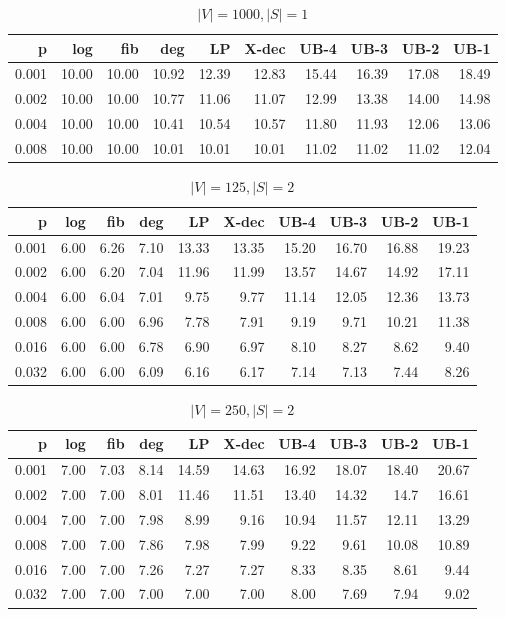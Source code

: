 \begin{table}[]
\centering
\begin{tabular}{rrrrrrrrrr}
p     & log  & fib  & deg  & LP    & X-dec & UB-4  & UB-3  & UB-2  & UB-1  \\
\hline
0.001 & 10.00 & 10.00 & 10.92 & 12.39 & 12.83 & 15.44 & 16.39 & 17.08 & 18.49 \\
0.002 & 10.00 & 10.00 & 10.77 & 11.06 & 11.07 & 12.99 & 13.38 & 14.00 & 14.98 \\
0.004 & 10.00 & 10.00 & 10.41 & 10.54 & 10.57 & 11.80 & 11.93 & 12.06 & 13.06 \\
0.008 & 10.00 & 10.00 & 10.01 & 10.01 & 10.01 & 11.02 & 11.02 & 11.02 & 12.04
\end{tabular}
\caption{$|V|=1000, |S|=1$}
\label{tab:lbup1000}
\end{table}

\begin{table}[]
\centering
\begin{tabular}{rrrrrrrrrr}
p     & log  & fib  & deg  & LP    & X-dec & UB-4  & UB-3  & UB-2  & UB-1  \\
\hline
0.001 & 6.00 & 6.26 & 7.10 & 13.33 & 13.35 & 15.20 & 16.70 & 16.88 & 19.23 \\
0.002 & 6.00 & 6.20 & 7.04 & 11.96 & 11.99 & 13.57 & 14.67 & 14.92 & 17.11 \\
0.004 & 6.00 & 6.04 & 7.01 & 9.75  & 9.77  & 11.14 & 12.05 & 12.36 & 13.73 \\
0.008 & 6.00 & 6.00 & 6.96 & 7.78  & 7.91  & 9.19  & 9.71  & 10.21 & 11.38 \\
0.016 & 6.00 & 6.00 & 6.78 & 6.90  & 6.97  & 8.10  & 8.27  & 8.62  & 9.40  \\
0.032 & 6.00 & 6.00 & 6.09 & 6.16  & 6.17  & 7.14  & 7.13  & 7.44  & 8.26 
\end{tabular}
\caption{$|V|=125, |S|=2$}
\label{tab:lbup1000}
\end{table}

\begin{table}[]
\centering
\begin{tabular}{rrrrrrrrrr}
p     & log  & fib  & deg  & LP    & X-dec & UB-4  & UB-3  & UB-2  & UB-1  \\
\hline
0.001 & 7.00 & 7.03 & 8.14 & 14.59 & 14.63 & 16.92 & 18.07 & 18.40 & 20.67 \\
0.002 & 7.00 & 7.00 & 8.01 & 11.46 & 11.51 & 13.40 & 14.32 & 14.7  & 16.61 \\
0.004 & 7.00 & 7.00 & 7.98 & 8.99  & 9.16  & 10.94 & 11.57 & 12.11 & 13.29 \\
0.008 & 7.00 & 7.00 & 7.86 & 7.98  & 7.99  & 9.22  & 9.61  & 10.08 & 10.89 \\
0.016 & 7.00 & 7.00 & 7.26 & 7.27  & 7.27  & 8.33  & 8.35  & 8.61  & 9.44  \\
0.032 & 7.00 & 7.00 & 7.00 & 7.00  & 7.00  & 8.00  & 7.69  & 7.94  & 9.02 
\end{tabular}
\caption{$|V|=250, |S|=2$}
\label{tab:lbup1000}
\end{table}

